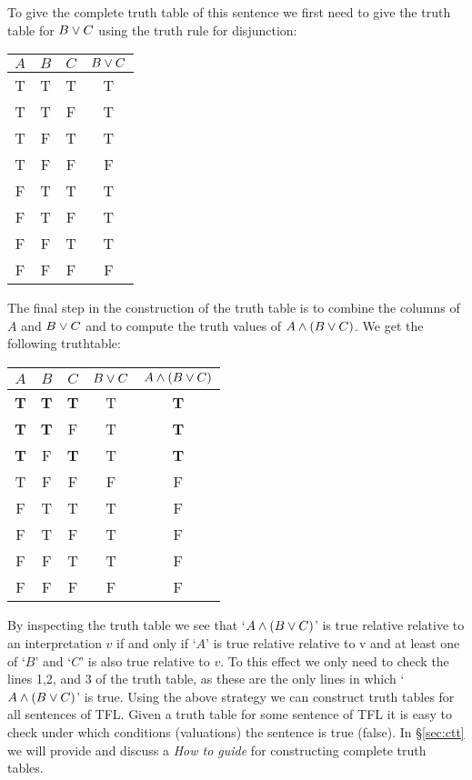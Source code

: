 To give the complete truth table of this sentence we first need to give the truth table for $B\vee C$ using the truth rule for disjunction:

\begin{center}
\begin{tabular}{ccc|c}
$A$&$B$&$C$&$B\vee C$\\\hline
T& T &T&T\\
T & T & F&T\\
T & F & T&T \\
T & F &F&F\\
F & T &T&T\\
F& T & F & T\\
F & F & T &T\\
F & F & F& F
\end{tabular}
\end{center}

The final step in the construction of the truth table is to combine the columns of $A$ and $B\vee C$ and to compute the truth values of $A\wedge (B\vee C)$. We get the following truthtable:

\begin{center}
\begin{tabular}{ccc|c||c}
$A$&$B$&$C$&$B\vee C$&$A\mathbin{\wedge}(B\vee C)$\\\hline
\textbf{T} & \textbf{T} &\textbf{T}& T & \textbf{T}\\
\textbf{T} & \textbf{T} & F& T & \textbf{T}\\
\textbf{T} & F & \textbf{T}& T& \textbf{T}\\
T & F &F&F& F\\
F & T &T&T&F\\
F& T & F & T &F\\
F & F & T &T &F\\
F & F & F& F& F
\end{tabular}
\end{center}

By inspecting the truth table we see that `$A\mathbin{\wedge}(B\vee C)$' is true relative relative to an interpretation $v$ if and only if `$A$' is true relative relative to v and at least one of `$B$' and `$C$' is also true relative to $v$. To this effect we only need to check the lines 1,2, and 3 of the truth table, as these are the only lines in which `$A\mathbin{\wedge}(B\vee C)$' is true. Using the above strategy we can construct truth tables for all sentences of TFL. Given a truth table for some sentence of TFL it is easy to check under which conditions (valuations) the sentence is true (false). In \S\ref{sec:ctt} we will provide and discuss a \emph{How to guide} for constructing complete truth tables.


